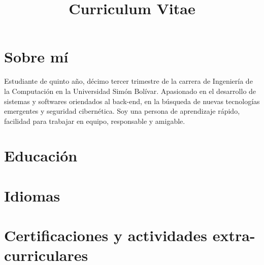 \documentclass[11pt,a4paper,sans]{moderncv} %
\title{Curriculum Vitae}
\begin{document}
\makecvtitle %

\section{Sobre m\'i}
    Estudiante de quinto a\~no, d\'ecimo tercer trimestre de la carrera de Ingenier\'ia de la Computaci\'on en la Universidad Sim\'on Bol\'ivar. Apasionado en el desarrollo de sistemas y softwares oriendados al back-end, en la b\'usqueda de nuevas tecnolog\'ias emergentes y seguridad cibern\'etica. Soy una persona de aprendizaje r\'apido, facilidad para trabajar en equipo, responsable y amigable.


\section{Educaci\'on}




\section{Idiomas}


\section{Certificaciones y actividades extra-curriculares}
\end{document}
